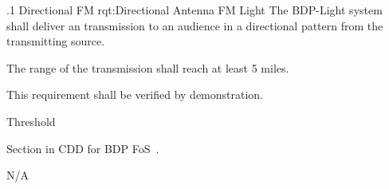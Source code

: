 
\NRQMTT
{\RqtNumberBase.1}
{Directional FM}
{rqt:Directional Antenna FM Light}
{The BDP-Light system shall deliver an \FM transmission to an audience in a directional pattern from the transmitting source.}%
{
	\item The range of the \FM transmission shall reach at least 5 miles.
}
{This requirement shall be verified by demonstration.}
{
	\item [Phase 1] Threshold
}
{
\item [5.1.2] Section in CDD for BDP FoS~\cite{ref__BDP_FOS_CDD}.	
} 
{
	\item N/A
}

